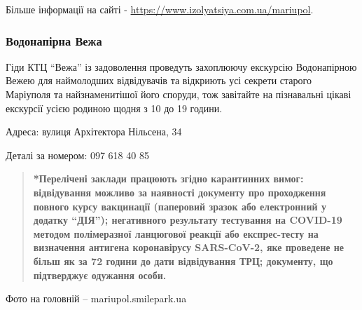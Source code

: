 Більше інформації на сайті - \url{https://www.izolyatsiya.com.ua/mariupol}.


\subsubsection{Водонапірна Вежа}

Гіди КТЦ \enquote{Вежа} із задоволення проведуть захоплюючу екскурсію Водонапірною
Вежею для наймолодших відвідувачів та відкриють усі секрети старого Маріуполя
та найзнаменитішої його споруди, тож завітайте на пізнавальні цікаві екскурсії
усією родиною щодня з 10 до 19 години.

Адреса: вулиця Архітектора Нільсена, 34

Деталі за номером: 097 618 40 85


\begin{quote}
\bfseries
*Перелічені заклади працюють згідно карантинних вимог: відвідування можливо за
наявності документу про проходження повного курсу вакцинації (паперовий зразок
або електронний у додатку \enquote{ДІЯ}); негативного результату тестування на COVID-19
методом полімеразної ланцюгової реакції або експрес-тесту на визначення
антигена коронавірусу SARS-CoV-2, яке проведене не більш як за 72 години до
дати відвідування ТРЦ; документу, що підтверджує одужання особи.	
\end{quote}

Фото на головній – mariupol.smilepark.ua
